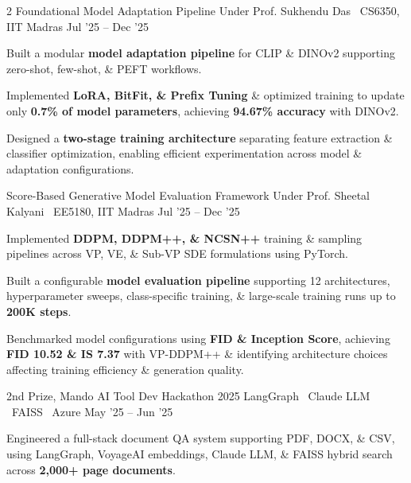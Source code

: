 \documentclass{resume}
\begin{document}
\begin{paracol}{2}
\resumeProject
{Foundational Model Adaptation Pipeline \href{https://hemanthdatta.github.io/tpa-17-blog/}{\small\faFile}}
{Under Prof. Sukhendu Das \textbar\ CS6350, IIT Madras}
{Jul '25 -- Dec '25}
{
\begin{resumeItemize}
\item Built a modular \textbf{model adaptation pipeline} for CLIP \& DINOv2 supporting zero-shot, few-shot, \& PEFT workflows.
\item Implemented \textbf{LoRA, BitFit, \& Prefix Tuning} \& optimized training to update only \textbf{0.7\% of model parameters}, achieving \textbf{94.67\% accuracy} with DINOv2.
\item Designed a \textbf{two-stage training architecture} separating feature extraction \& classifier optimization, enabling efficient experimentation across model \& adaptation configurations.
\end{resumeItemize}
}
{\href{https://github.com/hemanthdatta/tpa-17}{\faGithub}}
\resumeDivider

\resumeProject
{Score-Based Generative Model Evaluation Framework \href{https://hemanthdatta.github.io/score-based-website/}{\small\faFile}}
{Under Prof. Sheetal Kalyani \textbar\ EE5180, IIT Madras}
{Jul '25 -- Dec '25}
{
\begin{resumeItemize}
\item Implemented \textbf{DDPM, DDPM++, \& NCSN++} training \& sampling pipelines across VP, VE, \& Sub-VP SDE formulations using PyTorch.
\item Built a configurable \textbf{model evaluation pipeline} supporting 12 architectures, hyperparameter sweeps, class-specific training, \& large-scale training runs up to \textbf{200K steps}.
\item Benchmarked model configurations using \textbf{FID \& Inception Score}, achieving \textbf{FID 10.52 \& IS 7.37} with VP-DDPM++ \& identifying architecture choices affecting training efficiency \& generation quality.
\end{resumeItemize}
}
{\href{https://github.com/hemanthdatta/intro-to-ml-project}{\faGithub}}


\resumeProject
{2nd Prize, Mando AI Tool Dev Hackathon 2025}
{LangGraph \textbar\ Claude LLM \textbar\ FAISS \textbar\ Azure}
{May '25 -- Jun '25}
{
\begin{resumeItemize}
\item Engineered a full-stack document QA system supporting PDF, DOCX, \& CSV, using LangGraph, VoyageAI embeddings, Claude LLM, \& FAISS hybrid search across \textbf{2,000+ page documents}.
\end{resumeItemize}
}
{\href{https://github.com/hemanthdatta}{\faGithub}}


\end{paracol}
\end{document}
